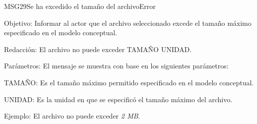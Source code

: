 \begin{mensaje}{MSG29}{Se ha excedido el tamaño del archivo}{Error}
    \item[Objetivo:] Informar al actor que el archivo seleccionado excede el tamaño máximo especificado en el modelo conceptual.
    \item[Redacción:] El archivo no puede exceder TAMAÑO UNIDAD.
    \item[Parámetros:] El mensaje se muestra con base en los siguientes parámetros:
    \begin{Citemize}
	\item TAMAÑO: Es el tamaño máximo permitido especificado en el modelo conceptual.
	\item UNIDAD: Es la unidad en que se especificó el tamaño máximo del archivo.
    \end{Citemize}
    \item[Ejemplo:] El archivo no puede exceder {\em 2 MB}.
\end{mensaje}
